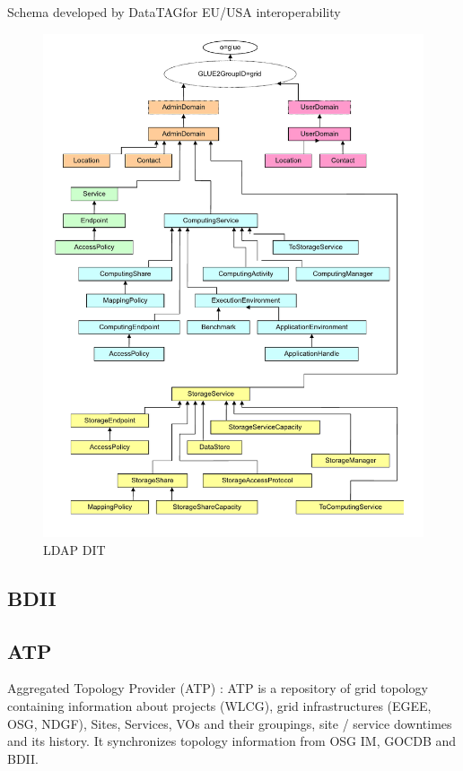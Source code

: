 Schema developed by DataTAGfor EU/USA interoperability


\begin{figure}[htb]
\centering
 \includegraphics[width=6in]{images/glue2.pdf}
\caption{LDAP DIT}
\label{figure:gluedit}
\end{figure}

\subsection{BDII}


\subsection{ATP}
Aggregated Topology Provider (ATP) : ATP is a repository of grid topology
containing information about projects (WLCG), grid infrastructures (EGEE, OSG,
NDGF), Sites, Services, VOs and their groupings, site / service downtimes and
its history. It synchronizes topology information from OSG IM, GOCDB and BDII.

